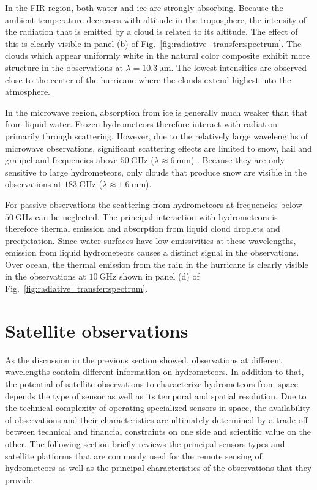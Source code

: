In the FIR region, both water and ice are strongly absorbing. Because the
ambient temperature decreases with altitude in the troposphere, the intensity of
the radiation that is emitted by a cloud is related to its altitude. The effect
of this is clearly visible in panel (b) of
Fig.~\ref{fig:radiative_transfer:spectrum}. The clouds which appear uniformly
white in the natural color composite exhibit  more structure in the
observations at $\lambda=\SI{10.3}{\micro \meter}$. The lowest intensities are
observed close to the center of the hurricane where the clouds extend highest
into the atmosphere.

In the microwave region, absorption from ice is generally much weaker than that
from liquid water. Frozen hydrometeors therefore interact with radiation
primarily through scattering. However, due to the relatively large wavelengths
of microwave observations, significant scattering effects are limited to snow,
hail and graupel and frequencies above $\SI{50}{\giga \hertz}$
($\lambda \approx \SI{6}{\milli \meter}$) . Because they are only sensitive to
large hydrometeors, only clouds that produce snow are visible in the
observations at $\SI{183}{\giga \hertz}$
($\lambda \approx \SI{1.6}{\milli \meter}$).

For passive observations the scattering from hydrometeors at frequencies below
$\SI{50}{\giga \hertz}$ can be neglected. The principal interaction with
hydrometeors is therefore thermal emission and absorption from liquid cloud
droplets and precipitation. Since water surfaces have low emissivities at these
wavelengths, emission from liquid hydrometeors causes a distinct signal in the
observations. Over ocean, the thermal emission from the rain in the hurricane is
clearly visible in the observations at $\SI{10}{\giga \hertz}$  shown in
panel (d) of Fig.~\ref{fig:radiative_transfer:spectrum}.

\section{Satellite observations}

As the discussion in the previous section showed, observations at different
wavelengths contain different information on hydrometeors. In addition to that,
the potential of satellite observations to characterize hydrometeors from space
depends the type of sensor as well as its temporal and spatial resolution. Due
to the technical complexity of operating specialized sensors in space, the
availability of observations and their characteristics are ultimately determined
by a trade-off between technical and financial constraints on one side and
scientific value on the other. The following section briefly reviews the
principal sensors types and satellite platforms that are commonly used for the
remote sensing of hydrometeors as well as the principal characteristics of
the observations that they provide.

